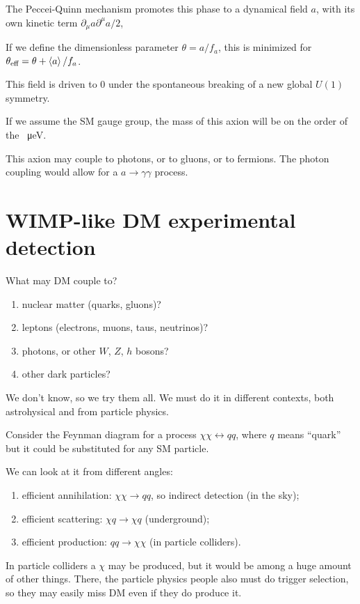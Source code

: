 \documentclass[main.tex]{subfiles}
\begin{document}
The Peccei-Quinn mechanism promotes this phase to a dynamical field \(a\), with its own kinetic term \(\partial_{\mu } a \partial^{\mu } a  / 2\), 

If we define the dimensionless parameter \(\theta = a / f_a\), this is minimized for \(\theta _{\text{eff}} = \theta + \expval{a} / f_a\).

This field is driven to 0 under the spontaneous breaking of a new global \(U(1)\) symmetry.

If we assume the SM gauge group, the mass of this axion will be on the order of the \SI{}{\micro eV}. 

This axion may couple to photons, or to gluons, or to fermions. 
The photon coupling would allow for a \(a \to \gamma \gamma \) process.

\section{WIMP-like DM experimental detection}

What may DM couple to? 
\begin{enumerate}
    \item nuclear matter (quarks, gluons)?
    \item leptons (electrons, muons, taus, neutrinos)?
    \item photons, or other \(W\), \(Z\), \(h\) bosons?
    \item other dark particles?
\end{enumerate}

We don't know, so we try them all. 
We must do it in different contexts, both astrohysical and from particle physics. 

Consider the Feynman diagram for a process \(\chi \chi \leftrightarrow q q \), where \(q\) means ``quark'' but it could be substituted for any SM particle. 

We can look at it from different angles:
\begin{enumerate}
    \item efficient annihilation: \(\chi \chi \to q q\), so indirect detection (in the sky);
    \item efficient scattering: \(\chi q \to \chi q\) (underground);
    \item efficient production: \(q q \to \chi \chi \) (in particle colliders).
\end{enumerate}

In particle colliders a \(\chi \) may be produced, but it would be among a huge amount of other things. 
There, the particle physics people also must do trigger selection, so they may easily miss DM even if they do produce it. 
\end{document}
